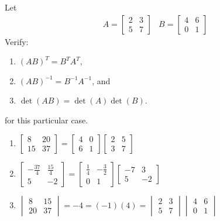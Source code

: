 \begin{Exercise}
Let
\begin{align*}
&A =
\begin{bmatrix}
2 & 3\\
5 & 7
\end{bmatrix}
&B =
\begin{bmatrix}
4 & 6\\
0 & 1
\end{bmatrix} 
\end{align*}
Verify:
\begin{enumerate}[label=(\alph*)]
\item $(AB)^T = B^TA^T$,
\item $(AB)^{-1} = B^{-1}A^{-1}$, and
\item $\det(AB) = \det(A)\det(B)$.
\end{enumerate} for this particular case.
\end{Exercise}
\begin{Answer}
\begin{enumerate}[label=(\alph*)]
\item 
$\begin{bmatrix}
8 & 20\\
15 & 37
\end{bmatrix}
=
\begin{bmatrix}
4 & 0 \\
6 & 1
\end{bmatrix}
\begin{bmatrix}
2 & 5 \\
3 & 7
\end{bmatrix}
$
\item $\begin{bmatrix}
-\frac{37}{4} & \frac{15}{4}\\
5 & -2    
\end{bmatrix} = 
\begin{bmatrix}
\frac{1}{4} & -\frac{3}{2}\\
0 & 1 
\end{bmatrix}
\begin{bmatrix}
-7 & 3\\
5 & -2  
\end{bmatrix}$
\item $\begin{vmatrix}
8 & 15\\
20 & 37
\end{vmatrix}
= -4 = (-1)(4) =
\begin{vmatrix}
2 & 3\\
5 & 7
\end{vmatrix}
\begin{vmatrix}
4 & 6\\
0 & 1
\end{vmatrix}$
\end{enumerate}
\end{Answer}

